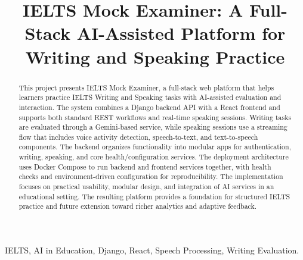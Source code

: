 ﻿\documentclass[conference]{IEEEtran}
\begin{document}
\title{IELTS Mock Examiner: A Full-Stack AI-Assisted Platform for Writing and Speaking Practice}

\author{
    \and
    \and
}

\maketitle

\begin{abstract}
This project presents IELTS Mock Examiner, a full-stack web platform that helps learners practice IELTS Writing and Speaking tasks with AI-assisted evaluation and interaction. The system combines a Django backend API with a React frontend and supports both standard REST workflows and real-time speaking sessions. Writing tasks are evaluated through a Gemini-based service, while speaking sessions use a streaming flow that includes voice activity detection, speech-to-text, and text-to-speech components. The backend organizes functionality into modular apps for authentication, writing, speaking, and core health/configuration services. The deployment architecture uses Docker Compose to run backend and frontend services together, with health checks and environment-driven configuration for reproducibility. The implementation focuses on practical usability, modular design, and integration of AI services in an educational setting. The resulting platform provides a foundation for structured IELTS practice and future extension toward richer analytics and adaptive feedback.
\end{abstract}

\begin{IEEEkeywords}
IELTS, AI in Education, Django, React, Speech Processing, Writing Evaluation.
\end{IEEEkeywords}
\end{document}
